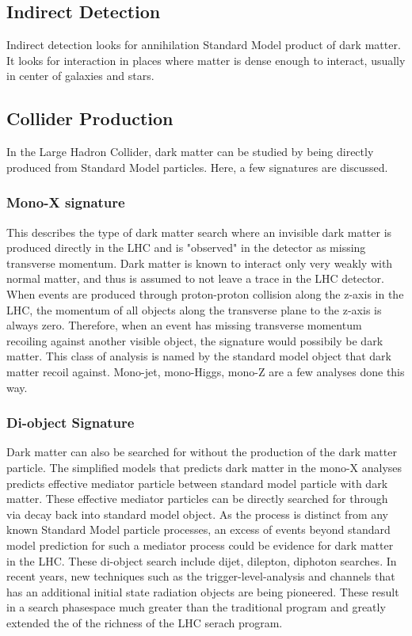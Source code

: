 \subsection{Indirect Detection}
Indirect detection looks for annihilation Standard Model product of dark matter. It looks for interaction in places where matter is dense enough to interact, usually in center of galaxies and stars. 


\subsection{Collider Production} 
    In the Large Hadron Collider, dark matter can be studied by being directly produced from Standard Model particles. Here, a few signatures are discussed. 

\subsubsection{Mono-X signature}
    This describes the type of dark matter search where an invisible dark matter is produced directly in the LHC and is "observed" in the detector as missing transverse momentum.
    Dark matter is known to interact only very weakly with normal matter, and thus is assumed to not leave a trace in the LHC detector. When events are produced through proton-proton collision along the z-axis in the LHC, the momentum of all objects along the transverse plane to the z-axis is always zero. Therefore, when an event has missing transverse momentum recoiling against another visible object, the signature would possibily be dark matter.
This class of analysis is named by the standard model object that dark matter recoil against. Mono-jet, mono-Higgs, mono-Z are a few analyses done this way. 

\subsubsection{Di-object Signature}
    Dark matter can also be searched for without the production of the dark matter particle. The simplified models that predicts dark matter in the mono-X analyses predicts effective mediator particle between standard model particle with dark matter. These effective mediator particles can be directly searched for through via decay back into standard model object. As the process is distinct from any known Standard Model particle processes, an excess of events beyond standard model prediction for
    such a mediator process could be evidence for dark matter in the LHC. 
These di-object search include dijet, dilepton, diphoton searches. 
In recent years, new techniques such as the trigger-level-analysis and channels that has an additional initial state radiation objects are being pioneered. These result in a search phasespace much greater than the traditional program and greatly extended the of the richness of the LHC serach program.

